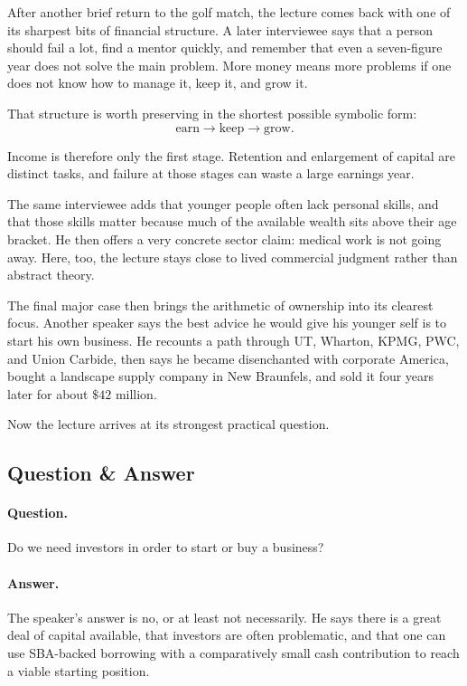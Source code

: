 After another brief return to the golf match, the lecture comes back with one of its sharpest bits of financial structure. A later interviewee says that a person should fail a lot, find a mentor quickly, and remember that even a seven-figure year does not solve the main problem. More money means more problems if one does not know how to manage it, keep it, and grow it.

That structure is worth preserving in the shortest possible symbolic form:
\begin{equation}
\text{earn} \longrightarrow \text{keep} \longrightarrow \text{grow}.
\end{equation}

Income is therefore only the first stage. Retention and enlargement of capital are distinct tasks, and failure at those stages can waste a large earnings year.

The same interviewee adds that younger people often lack personal skills, and that those skills matter because much of the available wealth sits above their age bracket. He then offers a very concrete sector claim: medical work is not going away. Here, too, the lecture stays close to lived commercial judgment rather than abstract theory.

The final major case then brings the arithmetic of ownership into its clearest focus. Another speaker says the best advice he would give his younger self is to start his own business. He recounts a path through UT, Wharton, KPMG, PWC, and Union Carbide, then says he became disenchanted with corporate America, bought a landscape supply company in New Braunfels, and sold it four years later for about \( \$42 \) million.

Now the lecture arrives at its strongest practical question.

\subsection{Question \& Answer}

\paragraph{Question.} Do we need investors in order to start or buy a business?

\paragraph{Answer.} The speaker's answer is no, or at least not necessarily. He says there is a great deal of capital available, that investors are often problematic, and that one can use SBA-backed borrowing with a comparatively small cash contribution to reach a viable starting position.

